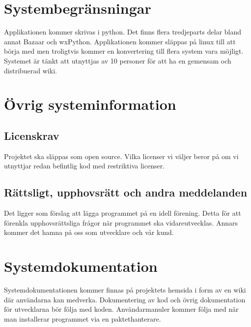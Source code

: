 \section{Systembegränsningar}
Applikationen kommer skrivas i python. Det finns flera tredjeparts delar bland annat Bazaar och wxPython. Applikationen kommer släppas på linux till att börja med men troligtvis kommer en konvertering till flera system vara möjligt. Systemet är tänkt att utnyttjas av 10 personer för att ha en gemensam och distribuerad wiki.

\section{Övrig systeminformation} %

\subsection{Licenskrav}
Projektet ska släppas som open source. Vilka licenser vi väljer beror på om vi utnyttjar redan befintlig kod med restriktiva licenser.

\subsection{Rättsligt, upphovsrätt och andra meddelanden}
Det ligger som förslag att lägga programmet på en idell förening. Detta för att förenkla upphovsrättsliga frågor när programmet ska vidareutvecklas. Annars kommer det hamna på oss som utvecklare och vår kund. 


\section{Systemdokumentation}
Systemdokumentationen kommer finnas på projektets hemsida i form av en wiki där användarna kan medverka. Dokumentering av kod och övrig dokumentation för utvecklarna bör följa med koden. Användarmanuler kommer följa med när man installerar programmet via en paktethanterare. %


